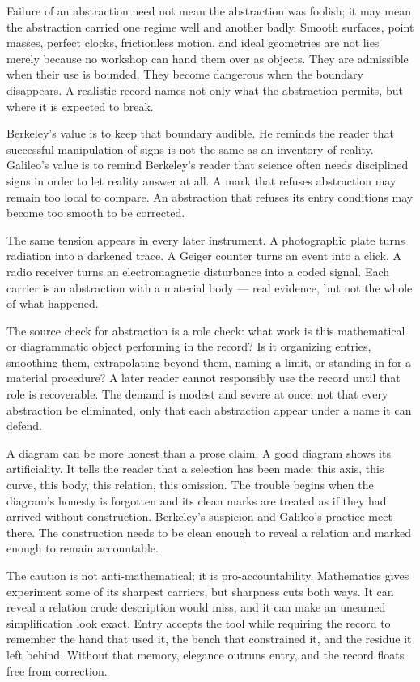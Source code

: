 Failure of an abstraction need not mean the abstraction was foolish; it
may mean the abstraction carried one regime well and another badly. Smooth
surfaces, point masses, perfect clocks, frictionless motion, and ideal
geometries are not lies merely because no workshop can hand them over as
objects. They are admissible when their use is bounded. They become
dangerous when the boundary disappears. A realistic record names not only
what the abstraction permits, but where it is expected to break.

Berkeley's value is to keep that boundary audible. He reminds the reader
that successful manipulation of signs is not the same as an inventory of
reality. Galileo's value is to remind Berkeley's reader that science often
needs disciplined signs in order to let reality answer at all. A mark that
refuses abstraction may remain too local to compare. An abstraction that
refuses its entry conditions may become too smooth to be corrected.

The same tension appears in every later instrument. A photographic plate
turns radiation into a darkened trace. A Geiger counter turns an event
into a click. A radio receiver turns an electromagnetic disturbance into a
coded signal. Each carrier is an abstraction with a material body --- real
evidence, but not the whole of what happened.

The source check for abstraction is a role check: what work is this
mathematical or diagrammatic object performing in the record? Is it
organizing entries, smoothing them, extrapolating beyond them, naming a
limit, or standing in for a material procedure? A later reader cannot
responsibly use the record until that role is recoverable. The demand is
modest and severe at once: not that every abstraction be eliminated, only
that each abstraction appear under a name it can defend.

A diagram can be more honest than a prose claim. A good diagram shows its
artificiality. It tells the reader that a selection has been made: this
axis, this curve, this body, this relation, this omission. The trouble
begins when the diagram's honesty is forgotten and its clean marks are
treated as if they had arrived without construction. Berkeley's suspicion
and Galileo's practice meet there. The construction needs to be clean
enough to reveal a relation and marked enough to remain accountable.

The caution is not anti-mathematical; it is pro-accountability.
Mathematics gives experiment some of its sharpest carriers, but sharpness
cuts both ways. It can reveal a relation crude description would miss, and
it can make an unearned simplification look exact. Entry accepts the tool
while requiring the record to remember the hand that used it, the bench
that constrained it, and the residue it left behind. Without that memory,
elegance outruns entry, and the record floats free from correction.

